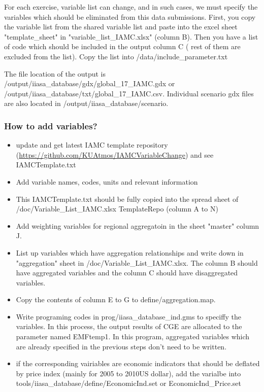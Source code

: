 \documentclass[10pt,a4paper,titlepage,dvipdfmx]{book}
\begin{document}
\begin{itemize}
For each exercise, variable list can change, and in such cases, we must specify the variables which should be eliminated from this data submissions. 
First, you copy the variable list from the shared variable list and paste into the excel sheet "template\_sheet" in "variable\_list\_IAMC.xlsx" (column B). 
Then you have a list of code which should be included in the output column C ( rest of them are excluded from the list). 
Copy the list into /data/include\_parameter.txt

  The file location of the output is /output/iiasa\_database/gdx/global\_17\_IAMC.gdx or /output/iiasa\_database/txt/global\_17\_IAMC.csv.
Individual scenario gdx files are also located in /output/iiasa\_database/scenario.

\subsubsection{\label{subsubsec:HowtoAddVar}How to add variables?}

\begin{itemize}
\item update and get latest IAMC template repository (\url{https://github.com/KUAtmos/IAMCVariableChange}) and see IAMCTemplate.txt
\item Add variable names, codes, units and relevant information
\item	This IAMCTemplate.txt should be fully copied into the spread sheet of /doc/Variable\_List\_IAMC.xlsx TemplateRepo (column A to N)
\item	Add weighting variables for regional aggregatoin in the sheet "master" column J.
\item	List up variables which have aggregation relationships and write down in "aggregation" sheet in /doc/Variable\_List\_IAMC.xlsx. The column B should have aggregated variables and the column C should have disaggregated variables. 
\item	Copy the contents of column E to G to define/aggregation.map.
\item	Write programing codes in prog/iiasa\_database\_ind.gms to speciffy the variables. In this process, the output results of CGE are allocated to the parameter named EMFtemp1. In this program, aggregated variables which are already specified in the previous steps don't need to be written.
\item	if the corresponding vairiables are economic indicators that should be deflated by price index (mainly for 2005 to 2010US dollar), 
add the varialbe into tools/iiasa\_database/define/EconomicInd.set or EconomicInd\_Price.set
\end{itemize}



\end{itemize}
\end{document}
